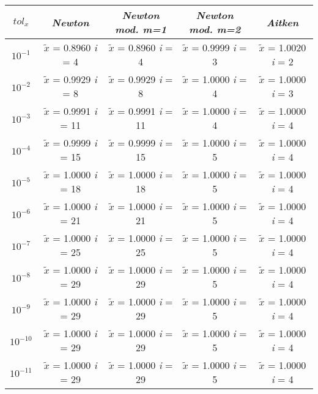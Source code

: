 \begin{center}
\begin{tabular}{|c|c|c|c|c|}
\hline
$tol_x$ & \textit{Newton} & \textit{Newton mod. m=1} & \textit{Newton mod. m=2} & \textit{Aitken} \\
\hline
$10^{-1}$ & $\tilde{x}$ = 0.8960 \quad \textit{i} = 4 & $\tilde{x}$ = 0.8960 \quad \textit{i} = 4 & $\tilde{x}$ = 0.9999 \quad \textit{i} = 3 & $\tilde{x}$ = 1.0020 \quad \textit{i} = 2\\
$10^{-2}$ & $\tilde{x}$ = 0.9929 \quad \textit{i} = 8 & $\tilde{x}$ = 0.9929 \quad \textit{i} = 8 & $\tilde{x}$ = 1.0000 \quad \textit{i} = 4 & $\tilde{x}$ = 1.0000 \quad \textit{i} = 3\\
$10^{-3}$ & $\tilde{x}$ = 0.9991 \quad \textit{i} = 11 & $\tilde{x}$ = 0.9991 \quad \textit{i} = 11 & $\tilde{x}$ = 1.0000 \quad \textit{i} = 4 & $\tilde{x}$ = 1.0000 \quad \textit{i} = 4\\
$10^{-4}$ & $\tilde{x}$ = 0.9999 \quad \textit{i} = 15 & $\tilde{x}$ = 0.9999 \quad \textit{i} = 15 & $\tilde{x}$ = 1.0000 \quad \textit{i} = 5 & $\tilde{x}$ = 1.0000 \quad \textit{i} = 4\\
$10^{-5}$ & $\tilde{x}$ = 1.0000 \quad \textit{i} = 18 & $\tilde{x}$ = 1.0000 \quad \textit{i} = 18 & $\tilde{x}$ = 1.0000 \quad \textit{i} = 5 & $\tilde{x}$ = 1.0000 \quad \textit{i} = 4\\
$10^{-6}$ & $\tilde{x}$ = 1.0000 \quad \textit{i} = 21 & $\tilde{x}$ = 1.0000 \quad \textit{i} = 21 & $\tilde{x}$ = 1.0000 \quad \textit{i} = 5 & $\tilde{x}$ = 1.0000 \quad \textit{i} = 4\\
$10^{-7}$ & $\tilde{x}$ = 1.0000 \quad \textit{i} = 25 & $\tilde{x}$ = 1.0000 \quad \textit{i} = 25 & $\tilde{x}$ = 1.0000 \quad \textit{i} = 5 & $\tilde{x}$ = 1.0000 \quad \textit{i} = 4\\
$10^{-8}$ & $\tilde{x}$ = 1.0000 \quad \textit{i} = 29 & $\tilde{x}$ = 1.0000 \quad \textit{i} = 29 & $\tilde{x}$ = 1.0000 \quad \textit{i} = 5 & $\tilde{x}$ = 1.0000 \quad \textit{i} = 4\\
$10^{-9}$ & $\tilde{x}$ = 1.0000 \quad \textit{i} = 29 & $\tilde{x}$ = 1.0000 \quad \textit{i} = 29 & $\tilde{x}$ = 1.0000 \quad \textit{i} = 5 & $\tilde{x}$ = 1.0000 \quad \textit{i} = 4\\
$10^{-10}$ & $\tilde{x}$ = 1.0000 \quad \textit{i} = 29 & $\tilde{x}$ = 1.0000 \quad \textit{i} = 29 & $\tilde{x}$ = 1.0000 \quad \textit{i} = 5 & $\tilde{x}$ = 1.0000 \quad \textit{i} = 4\\
$10^{-11}$ & $\tilde{x}$ = 1.0000 \quad \textit{i} = 29 & $\tilde{x}$ = 1.0000 \quad \textit{i} = 29 & $\tilde{x}$ = 1.0000 \quad \textit{i} = 5 & $\tilde{x}$ = 1.0000 \quad \textit{i} = 4\\

\end{tabular}
\end{center}
